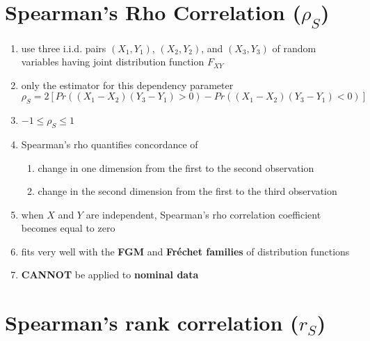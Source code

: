 \section{Spearman’s Rho Correlation ($\rho_S$) \cite{ism-1}} \label{Multivariate Distributions: Spearman’s Rho Correlation}

\begin{enumerate}
    \item use three i.i.d. pairs $(X_1, Y_1)$, $(X_2, Y_2)$, and $(X_3, Y_3)$ of random variables having joint distribution function $F_{XY}$

    \item only the estimator for this dependency parameter
    \[
        \rho_S = 2[Pr((X_1 - X_2)(Y_3 - Y_1) > 0) - Pr((X_1 - X_2)(Y_3 - Y_1) < 0)]
    \]

    \item[] $-1 \leq \rho_S \leq 1$
    
    \item Spearman’s rho quantifies concordance of 
    \begin{enumerate}
        \item change in one dimension from the first to the second observation

        \item change in the second dimension from the first to the third observation
    \end{enumerate}
    
    \item when $X$ and $Y$ are independent, Spearman’s rho correlation coefficient becomes equal to zero
    
    \item fits very well with the \textbf{FGM} and \textbf{Fréchet families} of distribution functions
    
    \item \textbf{CANNOT} be applied to \textbf{nominal data}
\end{enumerate}

\section{Spearman’s rank correlation ($r_S$) \cite{ism-1}} \label{Multivariate Distributions: Spearman’s rank correlation}

